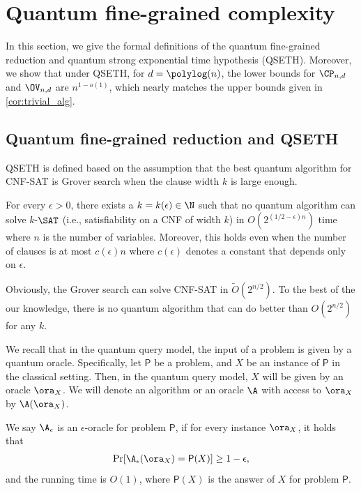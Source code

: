 \setcounter{section}{2}
\setcounter{theorem}{22}
\section{Quantum fine-grained complexity}

In this section, we give the formal definitions of the quantum fine-grained reduction and quantum strong exponential time hypothesis (QSETH). Moreover, we show that under QSETH, for $d=\polylog(n)$, the lower bounds for $\CP_{n,d}$ and $\OV_{n,d}$ are $n^{1-o(1)}$, which nearly matches the upper bounds given in \cref{cor:trivial_alg}.  

\subsection{Quantum fine-grained reduction and QSETH}

QSETH is defined based on the assumption that the best quantum algorithm for \textsf{CNF-SAT} is Grover search when the clause width $k$ is large enough. 
\begin{hypothesis}[QSETH]
For every $\epsilon > 0$, there exists a $k = k(\epsilon) \in \N$ such that no quantum algorithm can solve $k$-$\SAT$ (i.e., satisfiability on a CNF of width $k$) in $O(2^{(1/2 - \epsilon)n})$ time where $n$ is the number of variables. Moreover, this holds even when the number of clauses is at most $c(\epsilon) n$ where $c(\epsilon)$ denotes a constant that depends only on $\epsilon$.
\end{hypothesis}

Obviously, the Grover search can solve \textsf{CNF-SAT} in $\tilde{O}(2^{n/2})$. To the best of the our knowledge, there is no quantum algorithm that can do better than $O(2^{n/2})$ for any $k$. 


We recall that in the quantum query model, the input of a problem is given by a quantum oracle. Specifically, let $\mathsf{P}$ be a problem, and $X$ be an instance of $\mathsf{P}$ in the classical setting. Then, in the quantum query model, $X$ will be given by an oracle $\ora_X$. We will denote an algorithm or an oracle $\A$ with access to $\ora_X$ by $\A(\ora_X)$. 

We say $\A_{\epsilon}$ is an $\epsilon$-oracle for problem $\mathsf{P}$, if for every instance $\ora_X$, it holds that
\begin{align}
    \Pr[\A_{\epsilon}(\ora_X) = \mathsf{P}(X)] \geq 1-\epsilon,
\end{align}
and the running time is $O(1)$, where $\mathsf{P}(X)$ is the answer of $X$ for problem $\mathsf{P}$. 

